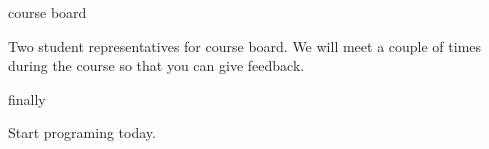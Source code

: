 \begin{frame}{course board}

  Two student representatives for course board. We will meet a couple
  of times during the course so that you can give feedback.

\end{frame}


\begin{frame}{finally}

  \pause\vspace{60pt}\hspace{40pt} Start programing today.

\end{frame}


